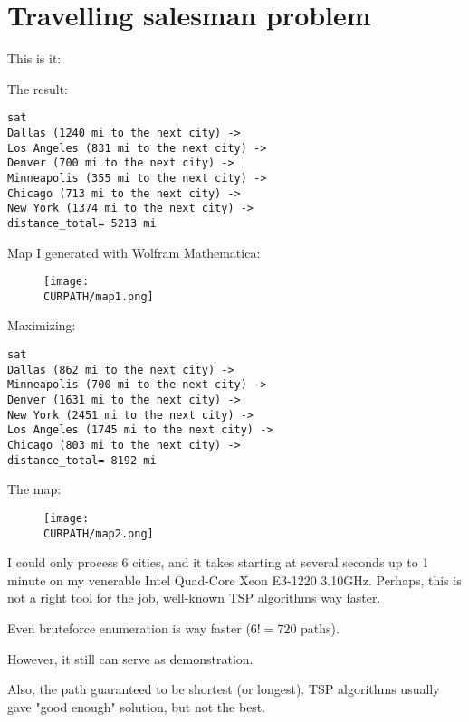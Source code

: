 \section{Travelling salesman problem}

\renewcommand{\CURPATH}{MaxSxT/TSP}

This is it:



The result:

\begin{lstlisting}
sat
Dallas (1240 mi to the next city) ->
Los Angeles (831 mi to the next city) ->
Denver (700 mi to the next city) ->
Minneapolis (355 mi to the next city) ->
Chicago (713 mi to the next city) ->
New York (1374 mi to the next city) ->
distance_total= 5213 mi
\end{lstlisting}

Map I generated with Wolfram Mathematica:

\begin{figure}[H]
\centering
\texttt{[image: \\CURPATH/map1.png]}
\caption{}
\end{figure}

Maximizing:

\begin{lstlisting}
sat
Dallas (862 mi to the next city) ->
Minneapolis (700 mi to the next city) ->
Denver (1631 mi to the next city) ->
New York (2451 mi to the next city) ->
Los Angeles (1745 mi to the next city) ->
Chicago (803 mi to the next city) ->
distance_total= 8192 mi
\end{lstlisting}

The map:

\begin{figure}[H]
\centering
\texttt{[image: \\CURPATH/map2.png]}
\caption{}
\end{figure}

I could only process 6 cities, and it takes starting at several seconds up to 1 minute on my venerable Intel Quad-Core Xeon E3-1220 3.10GHz.
Perhaps, this is not a right tool for the job, well-known TSP algorithms way faster.

Even bruteforce enumeration is way faster ($6!=720$ paths).

However, it still can serve as demonstration.

Also, the path guaranteed to be shortest (or longest).
TSP algorithms usually gave "good enough" solution, but not the best.

